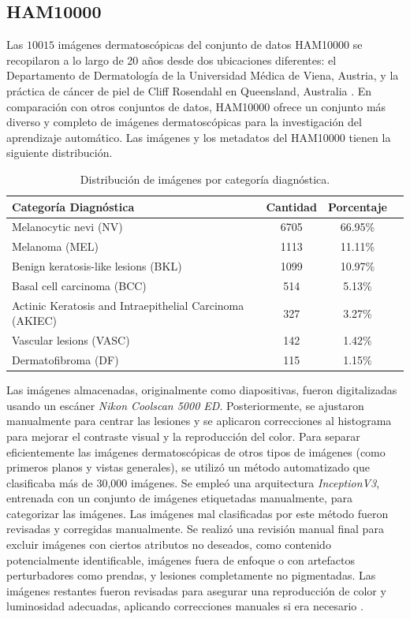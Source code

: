 \subsection*{HAM10000}

Las $10015$ imágenes dermatoscópicas del conjunto de datos HAM10000 se recopilaron a lo largo de 20 años desde dos ubicaciones diferentes: el Departamento de Dermatología de la Universidad Médica de Viena, Austria, y la práctica de cáncer de piel de Cliff Rosendahl en Queensland, Australia . En comparación con otros conjuntos de datos, HAM10000 ofrece un conjunto más diverso y completo de imágenes dermatoscópicas para la investigación del aprendizaje automático. Las imágenes y los metadatos del HAM10000  tienen la siguiente distribución.

\begin{table}[H]
   \centering
   \small
   \begin{tabular}{lccc}
   \hline
   \textbf{Categoría Diagnóstica} & \textbf{Cantidad} & \textbf{Porcentaje} \\
   \hline
   Melanocytic nevi (NV) & 6705 & 66.95\%  \\
   Melanoma (MEL) & 1113 & 11.11\% \\
   Benign keratosis-like lesions (BKL) & 1099 & 10.97\% \\
   Basal cell carcinoma (BCC) & 514 & 5.13\% \\
   Actinic Keratosis and Intraepithelial Carcinoma (AKIEC) & 327                         & 3.27\%              \\
   Vascular lesions (VASC) & 142 & 1.42\%  \\
   Dermatofibroma  (DF) & 115 & 1.15\% \\
   \hline
   \end{tabular}
   \caption{Distribución de imágenes por categoría diagnóstica.}
   \label{tab:ham10000_distribution}
\end{table}   
   
Las imágenes almacenadas, originalmente como diapositivas, fueron digitalizadas usando un escáner \textit{Nikon Coolscan 5000 ED}. Posteriormente, se ajustaron manualmente para centrar las lesiones y se aplicaron correcciones al histograma para mejorar el contraste visual y la reproducción del color. Para separar eficientemente las imágenes dermatoscópicas de otros tipos de imágenes (como primeros planos y vistas generales), se utilizó un método automatizado que clasificaba más de 30,000 imágenes. Se empleó una arquitectura \textit{InceptionV3}, entrenada con un conjunto de imágenes etiquetadas manualmente, para categorizar las imágenes. Las imágenes mal clasificadas por este método fueron revisadas y corregidas manualmente.  Se realizó una revisión manual final para excluir imágenes con ciertos atributos no deseados, como contenido potencialmente identificable, imágenes fuera de enfoque o con artefactos perturbadores como prendas, y lesiones completamente no pigmentadas. Las imágenes restantes fueron revisadas para asegurar una reproducción de color y luminosidad adecuadas, aplicando correcciones manuales si era necesario . 

